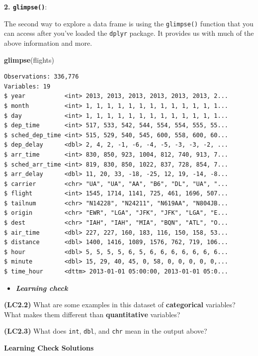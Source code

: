 \documentclass[12pt,]{krantz}
\makeatletter
\newenvironment{Shaded}{\begin{snugshade}}{\end{snugshade}}
\newcommand{\KeywordTok}[1]{\textcolor[rgb]{0.27,0.27,0.27}{\textbf{#1}}}
\newcommand{\NormalTok}[1]{#1}
\newenvironment{kframe}{%
\medskip{}
\setlength{\fboxsep}{.8em}
 \def\at@end@of@kframe{}%
 \ifinner\ifhmode%
  \def\at@end@of@kframe{\end{minipage}}%
  \begin{minipage}{\columnwidth}%
 \fi\fi%
 \def\FrameCommand##1{\hskip\@totalleftmargin \hskip-\fboxsep
 \colorbox{shadecolor}{##1}\hskip-\fboxsep
     \hskip-\linewidth \hskip-\@totalleftmargin \hskip\columnwidth}%
 \MakeFramed {\advance\hsize-\width
   \@totalleftmargin\z@ \linewidth\hsize
   \@setminipage}}%
 {\par\unskip\endMakeFramed%
 \at@end@of@kframe}
\renewenvironment{Shaded}{\begin{kframe}}{\end{kframe}}
\newenvironment{rmdblock}[1]
  {\begin{shaded*}
  \begin{itemize}
  \renewcommand{\labelitemi}{
    \raisebox{-.7\height}[0pt][0pt]{
    }
  }
  \item
  }
  {
  \end{itemize}
  \end{shaded*}
  }
\newenvironment{learncheck}
  {\begin{rmdblock}{warning}}
  {\end{rmdblock}}
\theoremstyle{definition}
\theoremstyle{definition}
\theoremstyle{definition}
\theoremstyle{remark}
\makeatother
\begin{document}
\textbf{2. \texttt{glimpse()}}:

The second way to explore a data frame is using the \texttt{glimpse()}
function that you can access after you've loaded the \texttt{dplyr}
package. It provides us with much of the above information and more.

\begin{Shaded}
\begin{Highlighting}[]
\KeywordTok{glimpse}\NormalTok{(flights)}
\end{Highlighting}
\end{Shaded}

\begin{verbatim}
Observations: 336,776
Variables: 19
$ year           <int> 2013, 2013, 2013, 2013, 2013, 2013, 2...
$ month          <int> 1, 1, 1, 1, 1, 1, 1, 1, 1, 1, 1, 1, 1...
$ day            <int> 1, 1, 1, 1, 1, 1, 1, 1, 1, 1, 1, 1, 1...
$ dep_time       <int> 517, 533, 542, 544, 554, 554, 555, 55...
$ sched_dep_time <int> 515, 529, 540, 545, 600, 558, 600, 60...
$ dep_delay      <dbl> 2, 4, 2, -1, -6, -4, -5, -3, -3, -2, ...
$ arr_time       <int> 830, 850, 923, 1004, 812, 740, 913, 7...
$ sched_arr_time <int> 819, 830, 850, 1022, 837, 728, 854, 7...
$ arr_delay      <dbl> 11, 20, 33, -18, -25, 12, 19, -14, -8...
$ carrier        <chr> "UA", "UA", "AA", "B6", "DL", "UA", "...
$ flight         <int> 1545, 1714, 1141, 725, 461, 1696, 507...
$ tailnum        <chr> "N14228", "N24211", "N619AA", "N804JB...
$ origin         <chr> "EWR", "LGA", "JFK", "JFK", "LGA", "E...
$ dest           <chr> "IAH", "IAH", "MIA", "BQN", "ATL", "O...
$ air_time       <dbl> 227, 227, 160, 183, 116, 150, 158, 53...
$ distance       <dbl> 1400, 1416, 1089, 1576, 762, 719, 106...
$ hour           <dbl> 5, 5, 5, 5, 6, 5, 6, 6, 6, 6, 6, 6, 6...
$ minute         <dbl> 15, 29, 40, 45, 0, 58, 0, 0, 0, 0, 0,...
$ time_hour      <dttm> 2013-01-01 05:00:00, 2013-01-01 05:0...
\end{verbatim}

\begin{learncheck}
\textbf{\emph{Learning check}}
\end{learncheck}

\textbf{(LC2.2)} What are some examples in this dataset of
\textbf{categorical} variables? What makes them different than
\textbf{quantitative} variables?

\textbf{(LC2.3)} What does \texttt{int}, \texttt{dbl}, and \texttt{chr}
mean in the output above?

\textbf{Learning Check Solutions}
\end{document}
